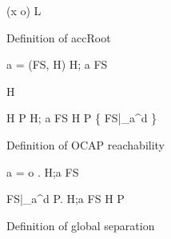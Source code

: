 \begin{figure}
  { (x \mapsto o) \in L }
  {  }

  \RuleSpace{}

  {  \: \lor \:  }
  {  }
  \caption{Definition of accRoot}
  \label{fig:def_accroot}
\end{figure}

\begin{figure}
  { a = \ocap \implies \ocrloc(FS, H) }
  { H; a \vdash FS \tsep \ocr }

  \RuleSpace{}

  {H \vdash \emptyset \tsep \ocr}

  \RuleSpace{}

  {H \vdash P \tsep \ocr \andalso H; a \vdash FS \tsep \ocr}
  {H \vdash P \cup \left\{ FS|_a^d \right\} \tsep \ocr}

  \caption{Definition of OCAP reachability}
  \label{fig:def_ocapreach}
\end{figure}

\begin{figure}
  {a = \ocap \implies \forall o \in {}. \:  }
  {H;a \vdash FS \tsep \gsep}

  \RuleSpace{}

  {\forall FS|_a^d \in P. \: H;a \vdash FS \tsep \gsep}
  {H \vdash P \tsep \gsep}

  \caption{Definition of global separation}
  \label{fig:def_gsep}
\end{figure}






